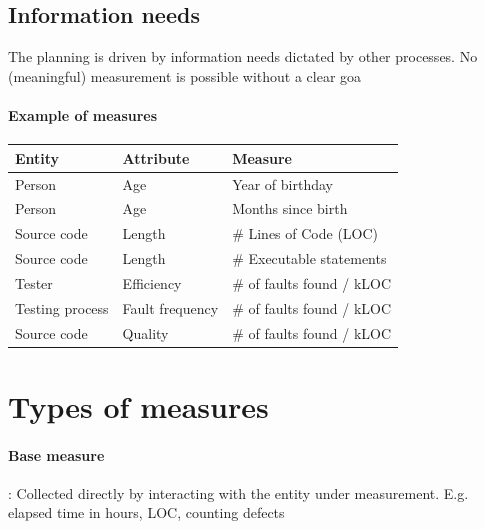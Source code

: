 \subsection{Information needs}

The planning is driven by information needs dictated by
other processes. No (meaningful) measurement is possible without a clear
goa

\paragraph{Example of measures}

\begin{table}[h!]
  \renewcommand{\arraystretch}{1.4}
  \centering
  \begin{tabular}{lll}
    \toprule
    \multicolumn{1}{l}{\textbf{Entity}} & \multicolumn{1}{l}{\textbf{Attribute}} & \multicolumn{1}{l}{\textbf{Measure}} \\
    \midrule
    Person                              & Age                                    & Year of birthday                     \\
    Person                              & Age                                    & Months since birth                   \\
    Source code                         & Length                                 & \# Lines of Code (LOC)               \\
    Source code                         & Length                                 & \# Executable statements             \\
    Tester                              & Efficiency                             & \# of faults found / kLOC            \\
    Testing process                     & Fault frequency                        & \# of faults found / kLOC            \\
    Source code                         & Quality                                & \# of faults found / kLOC            \\
    \bottomrule
  \end{tabular}
\end{table}



\section{Types of measures}

\paragraph{Base measure}: Collected directly by interacting with the entity under
measurement. E.g.  elapsed time in hours, LOC, counting defects
